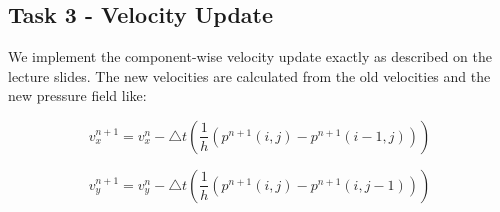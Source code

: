 \documentclass[11pt]{article}
\begin{document}
\subsection{Task 3 - Velocity Update}

We implement the component-wise velocity update exactly as described on the lecture slides. The new velocities are calculated from the old velocities and the new pressure field like:

$$v^{n+1}_{x} = v^{n}_{x} -\triangle t(\frac{1}{h}(p^{n+1}(i,j) - p^{n+1}(i-1,j)))$$

$$v^{n+1}_{y} = v^{n}_{y} -\triangle t(\frac{1}{h}(p^{n+1}(i,j) - p^{n+1}(i,j-1)))$$

    
    
\end{document}
